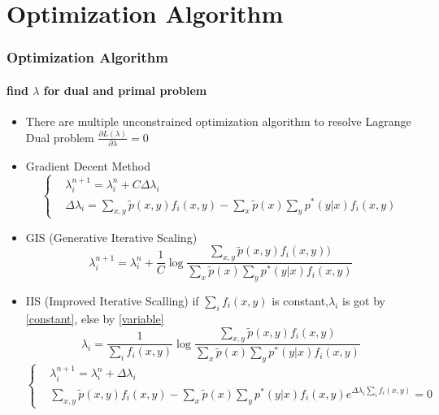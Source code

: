\section{Optimization Algorithm}
\begin{frame}
	\frametitle{Optimization Algorithm}
	\framesubtitle{find $\lambda$ for dual and primal problem}	
	\begin{scriptsize}
	\begin{itemize}
		\item There are multiple unconstrained optimization algorithm to resolve Lagrange Dual problem $\frac{\partial L(\lambda)}{\partial \lambda}=0$
		\item Gradient Decent Method
		\begin{equation}
			\left\{
			\begin{aligned}
			&\lambda_i^{n+1}=\lambda_i^{n}+C\Delta\lambda_i \\
			&\Delta\lambda_i=\sum_{x,y}\widetilde{p}(x,y)f_i(x,y)-\sum_{x}\widetilde{p}(x)\sum_{y}p^*(y|x)f_i(x,y)
			\end{aligned}
			\right.
		\end{equation}
		\item GIS (Generative Iterative Scaling)
		\begin{equation}
			\lambda_i^{n+1}=\lambda_i^{n}+\frac{1}{C}\log\frac{\sum_{x,y}\widetilde{p}(x,y)f_i(x,y))}{\sum_{x}\widetilde{p}(x)\sum_{y}p^*(y|x)f_i(x,y)}
		\end{equation}
		\item IIS (Improved Iterative Scalling)
		if $\sum_if_i(x,y)$ is constant,$\lambda_i$ is got by \ref{constant}, else by \ref{variable}
		\begin{equation}\label{constant}
			\lambda_i=\frac{1}{\sum_if_i(x,y)}\log\frac{\sum_{x,y}\widetilde{p}(x,y)f_i(x,y)}{\sum_{x}\widetilde{p}(x)\sum_{y}p^*(y|x)f_i(x,y)}
		\end{equation}
		\begin{equation}\label{variable}
			\left\{
			\begin{aligned}
			&\lambda_i^{n+1}=\lambda_i^{n}+\Delta\lambda_i \\
			&\sum_{x,y}\widetilde{p}(x,y)f_i(x,y)-\sum_{x}\widetilde{p}(x)\sum_{y}p^*(y|x)f_i(x,y)e^{\Delta\lambda_i\sum_if_i(x,y)}=0
			\end{aligned}
			\right.
		\end{equation}
		\end{itemize}
	\end{scriptsize}
\end{frame}
